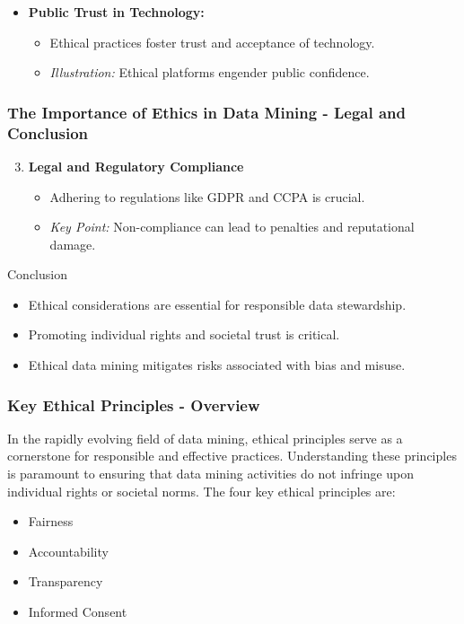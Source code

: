 \documentclass{beamer}
\begin{document}
\begin{frame}[fragile]
\begin{enumerate}
\begin{itemize}
                \item \textbf{Public Trust in Technology:}
                    \begin{itemize}
                        \item Ethical practices foster trust and acceptance of technology.
                        \item \textit{Illustration:} Ethical platforms engender public confidence.
                    \end{itemize}
            \end{itemize}
    \end{enumerate}
\end{frame}

\begin{frame}[fragile]
    \frametitle{The Importance of Ethics in Data Mining - Legal and Conclusion}
    \begin{enumerate}
        \setcounter{enumi}{2}
        \item \textbf{Legal and Regulatory Compliance}
            \begin{itemize}
                \item Adhering to regulations like GDPR and CCPA is crucial.
                \item \textit{Key Point:} Non-compliance can lead to penalties and reputational damage.
            \end{itemize}
    \end{enumerate}
    \begin{block}{Conclusion}
        \begin{itemize}
            \item Ethical considerations are essential for responsible data stewardship.
            \item Promoting individual rights and societal trust is critical.
            \item Ethical data mining mitigates risks associated with bias and misuse.
        \end{itemize}
    \end{block}
\end{frame}

\begin{frame}[fragile]
    \frametitle{Key Ethical Principles - Overview}
    In the rapidly evolving field of data mining, ethical principles serve as a cornerstone for responsible and effective practices. Understanding these principles is paramount to ensuring that data mining activities do not infringe upon individual rights or societal norms. The four key ethical principles are:
    \begin{itemize}
        \item Fairness
        \item Accountability
        \item Transparency
        \item Informed Consent
    \end{itemize}
\end{frame}
\end{document}
